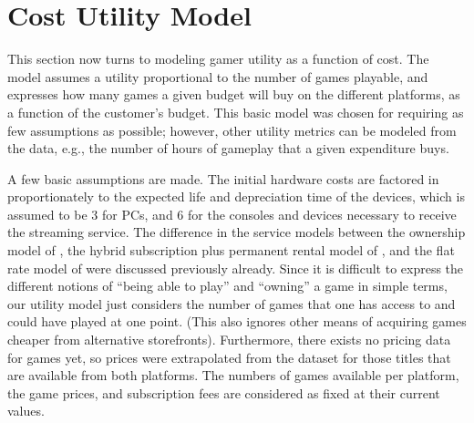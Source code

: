 \section{Cost Utility Model}
\label{sec:utilitymodel}

This section now turns to modeling gamer utility as a function
of cost. The model assumes a utility proportional to the number
of games playable, and expresses how many games a given budget will
buy on the different platforms, as a function of the customer's
budget. This basic model was chosen for requiring as few assumptions
as possible;
however, other utility metrics can be modeled from the data,
e.g., the number of hours of gameplay that a given expenditure buys.

A few basic assumptions are made. The initial hardware costs are
factored in proportionately to the expected life and depreciation time
of the devices, which is assumed to be \SI{3}{\year} for PCs, and
\SI{6}{\year} for the consoles and devices necessary to receive the
streaming service.
The difference in the service models between the ownership model of
\steam, the hybrid subscription plus permanent rental model of \gfnow,
and the flat rate model of \psnow were discussed previously already.
Since it is difficult to express the different notions of ``being able
to play'' and ``owning'' a game in simple terms, our utility model just
considers the number of games that one has access to and could have
played at one point. (This also ignores other means of acquiring
games cheaper from alternative storefronts).
Furthermore, there exists no pricing data for \gfnow games yet,
so prices were extrapolated from the \steam dataset for those
titles that are available from both platforms.
The numbers of games available per platform, the game prices,
and subscription fees are considered as fixed at their current values.



